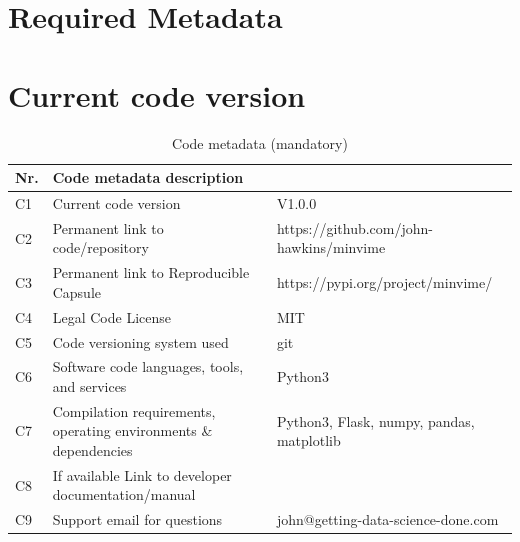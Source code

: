 \documentclass[preprint,12pt, a4paper]{elsarticle}
\begin{document}





\section*{Required Metadata}
\label{}

\section*{Current code version}
\label{}

\begin{table}[!h]
\begin{tabular}{|l|p{6.5cm}|p{6.5cm}|}
\hline
\textbf{Nr.} & \textbf{Code metadata description} & \textbf{} \\
\hline
C1 & Current code version & V1.0.0 \\
\hline
C2 & Permanent link to code/repository & https://github.com/john-hawkins/minvime \\
\hline
C3  & Permanent link to Reproducible Capsule & https://pypi.org/project/minvime/ \\
\hline
C4 & Legal Code License   & MIT \\
\hline
C5 & Code versioning system used & git \\
\hline
C6 & Software code languages, tools, and services & Python3\\
\hline
C7 & Compilation requirements, operating environments \& dependencies & Python3, Flask, numpy, pandas, matplotlib\\
\hline
C8 & If available Link to developer documentation/manual & \\
\hline
C9 & Support email for questions & john@getting-data-science-done.com \\
\hline
\end{tabular}
\caption{Code metadata (mandatory)}
\label{} 
\end{table}
\end{document}
